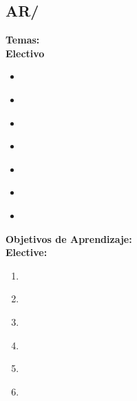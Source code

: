 \subsection{AR/\ARPerformanceenhancements}\label{sec:BOK:ARPerformanceenhancements}
\noindent \textbf{Temas:}\\
\noindent \textbf{Electivo}
\begin{itemize}
	\item \ARPerformanceenhancementsTopicSuperscalar\label{sec:BOK:ARPerformanceenhancementsTopicSuperscalar}
	\item \ARPerformanceenhancementsTopicBranch\label{sec:BOK:ARPerformanceenhancementsTopicBranch}
	\item \ARPerformanceenhancementsTopicPrefetching\label{sec:BOK:ARPerformanceenhancementsTopicPrefetching}
	\item \ARPerformanceenhancementsTopicVector\label{sec:BOK:ARPerformanceenhancementsTopicVector}
	\item \ARPerformanceenhancementsTopicHardware\label{sec:BOK:ARPerformanceenhancementsTopicHardware}
	\item \ARPerformanceenhancementsTopicScalability\label{sec:BOK:ARPerformanceenhancementsTopicScalability}
	\item \ARPerformanceenhancementsTopicAlternative\label{sec:BOK:ARPerformanceenhancementsTopicAlternative}
\end{itemize}


\noindent \textbf{Objetivos de Aprendizaje:}\\
\noindent \textbf{Elective:}
\begin{enumerate}
	\setcounter{enumi}{0}
	\item \ARPerformanceenhancementsLODescribeSuperscalar\xspace[\ARPerformanceenhancementsLODescribeSuperscalarLevel]\label{sec:BOK:ARPerformanceenhancementsLODescribeSuperscalar}
	\item \ARPerformanceenhancementsLOExplainTheBranch\xspace[\ARPerformanceenhancementsLOExplainTheBranchLevel]\label{sec:BOK:ARPerformanceenhancementsLOExplainTheBranch}
	\item \ARPerformanceenhancementsLOCharacterize\xspace[\ARPerformanceenhancementsLOCharacterizeLevel]\label{sec:BOK:ARPerformanceenhancementsLOCharacterize}
	\item \ARPerformanceenhancementsLOExplainSpeculative\xspace[\ARPerformanceenhancementsLOExplainSpeculativeLevel]\label{sec:BOK:ARPerformanceenhancementsLOExplainSpeculative}
	\item \ARPerformanceenhancementsLODiscussTheThatIn\xspace[\ARPerformanceenhancementsLODiscussTheThatInLevel]\label{sec:BOK:ARPerformanceenhancementsLODiscussTheThatIn}
	\item \ARPerformanceenhancementsLODescribeTheScalability\xspace[\ARPerformanceenhancementsLODescribeTheScalabilityLevel]\label{sec:BOK:ARPerformanceenhancementsLODescribeTheScalability}
\end{enumerate}




